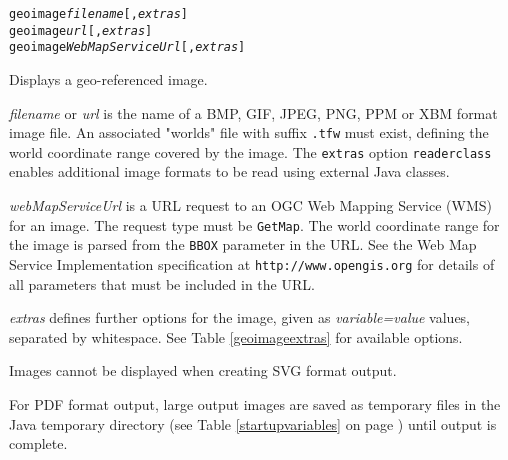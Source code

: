 \begin{alltt}
geoimage \textit{filename} [, \textit{extras} ]
geoimage \textit{url} [, \textit{extras} ]
geoimage \textit{WebMapServiceUrl} [, \textit{extras} ]
\end{alltt}

Displays a geo-referenced image.

\textit{filename} or
\textit{url}
is the name of a BMP, GIF, JPEG, PNG, PPM or XBM format image file.
An associated "worlds" file with suffix \texttt{.tfw} must exist,
defining the world coordinate range covered by the image.
The \texttt{extras} option \texttt{readerclass} enables additional
image formats to be read using external Java classes.

\textit{webMapServiceUrl} is a URL request to an
OGC Web Mapping Service (WMS)
for an image.  The request type must be \texttt{GetMap}.
The world coordinate range for the image is parsed from the
\texttt{BBOX} parameter in the URL.
See the Web Map Service Implementation specification at
\texttt{http://www.opengis.org}
for details of all parameters that must be included in the URL.

\textit{extras} defines further options for the image, given as
\textit{variable=value} values, separated by whitespace.
See Table \ref{geoimageextras}
for available options.

Images cannot be displayed when creating SVG format output.

For PDF format output, large output images are saved as temporary
files in the Java temporary directory
(see Table \ref{startupvariables} on page \pageref{startupvariables})
until output is complete.

